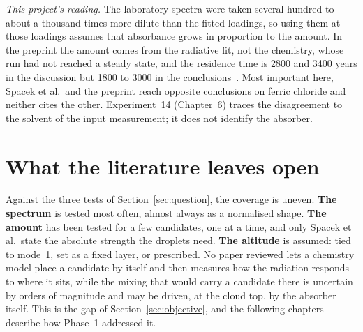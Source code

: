 \emph{This project's reading.} The laboratory spectra were taken several hundred to about
a thousand times more dilute than the fitted loadings, so using them at those loadings
assumes that absorbance grows in proportion to the amount. In the
preprint the amount comes from the radiative fit, not the chemistry, whose run had not
reached a steady state, and the residence time is 2800 and 3400 years in the discussion
but 1800 to 3000 in the conclusions~\cite{egan2026}. Most important here, Spacek et al.\
and the preprint reach opposite conclusions on ferric chloride and neither cites the
other. Experiment~14 (Chapter~6) traces the disagreement to the solvent of the input
measurement; it does not identify the absorber.

\section{What the literature leaves open}
\label{sec:lit-gap}

Against the three tests of Section~\ref{sec:question}, the coverage is uneven.
\textbf{The spectrum} is tested most often, almost always as a normalised shape.
\textbf{The amount} has been tested for a few candidates, one at a time, and only Spacek
et al.\ state the absolute strength the droplets need. \textbf{The altitude} is assumed:
tied to mode~1, set as a fixed layer, or prescribed. No paper reviewed lets a chemistry
model place a candidate by itself and then measures how the radiation responds to where
it sits, while the mixing that would carry a candidate there is uncertain by orders of
magnitude and may be driven, at the cloud top, by the absorber itself. This is the gap of
Section~\ref{sec:objective}, and the following chapters describe how Phase~1 addressed it.
